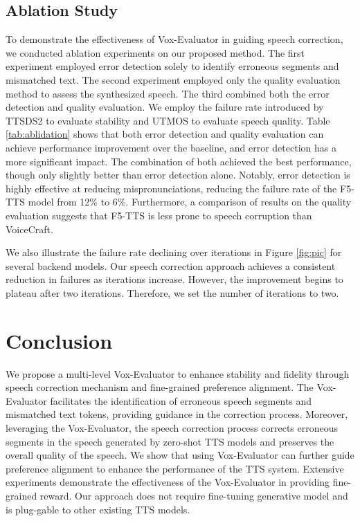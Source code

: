 \documentclass[letterpaper]{article} %
\begin{document}
\subsection{Ablation Study}
To demonstrate the effectiveness of Vox-Evaluator in guiding speech correction, we conducted ablation experiments on our proposed method. 
The first experiment employed error detection solely to identify erroneous segments and mismatched text.
The second experiment employed only the quality evaluation method to assess the synthesized speech.
The third combined both the error detection and quality evaluation. We employ the failure rate introduced by TTSDS2 to evaluate stability and UTMOS to evaluate speech quality.
Table \ref{tab:ablidation} shows that both error detection and quality evaluation can achieve performance improvement over the baseline, and error detection has a more significant impact. The combination of both achieved the best performance, though only slightly better than error detection alone. Notably, error detection is highly effective at reducing mispronunciations, reducing the failure rate of the F5-TTS model from 12\% to 6\%. Furthermore, a comparison of results on the quality evaluation suggests that F5-TTS is less prone to speech corruption than VoiceCraft.

We also illustrate the failure rate declining over iterations in Figure \ref{fig:pic} for several backend models. Our speech correction approach achieves a consistent reduction in failures as iterations increase. However, the improvement begins to plateau after two iterations. Therefore, we set the number of iterations to two.

\section{Conclusion}
We propose a multi-level Vox-Evaluator to enhance stability and fidelity through speech correction mechanism and fine-grained preference alignment. The Vox-Evaluator facilitates the identification of erroneous speech segments and mismatched text tokens, providing guidance in the correction process. Moreover, leveraging the Vox-Evaluator, the speech correction process corrects erroneous segments in the speech generated by zero-shot TTS models and preserves the overall quality of the speech.
We show that using Vox-Evaluator can further guide preference alignment to enhance the performance of the TTS system. Extensive experiments demonstrate the effectiveness of the Vox-Evaluator in providing fine-grained reward. Our approach does not require fine-tuning generative model and is plug-gable to other existing TTS models.

\end{document}

